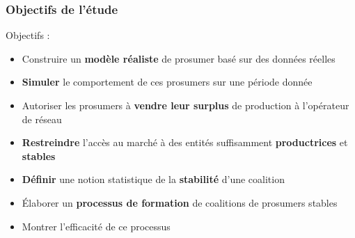 \documentclass[xcolor=dvipsnames]{beamer}
\begin{document}
%
%
\begin{frame}
	\frametitle{Objectifs de l'étude}
	
Objectifs :
\begin{itemize}
\item Construire un \textbf{modèle réaliste} de prosumer basé sur des données réelles
\item \textbf{Simuler} le comportement de ces prosumers sur une période donnée
\item Autoriser les prosumers à \textbf{vendre leur surplus} de production à l'opérateur de réseau
\item \textbf{Restreindre} l'accès au marché à des entités suffisamment \textbf{productrices} et \textbf{stables}
\item \textbf{Définir} une notion statistique de la \textbf{stabilité} d'une coalition
\item Élaborer un \textbf{processus de formation} de coalitions de prosumers stables
\item Montrer l'efficacité de ce processus
\end{itemize}

\end{frame}
\end{document}
